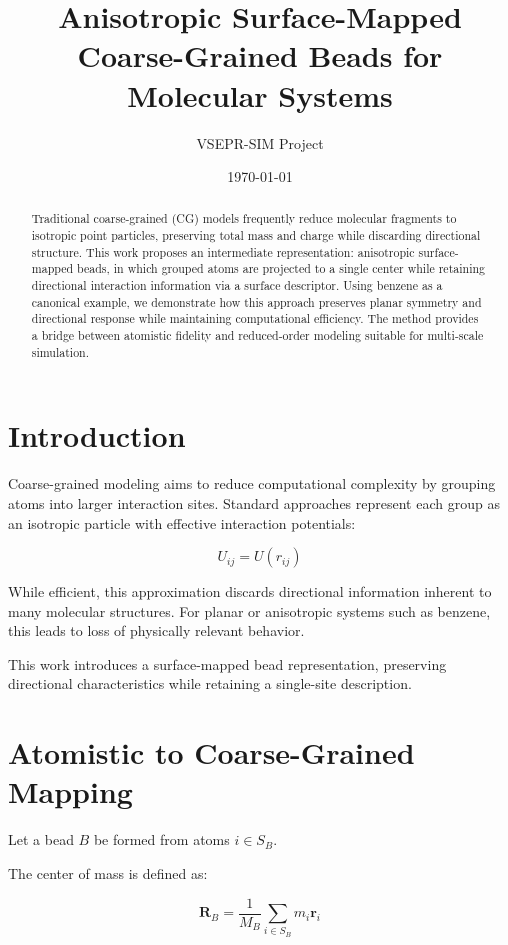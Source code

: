 \documentclass[11pt]{article}
\title{Anisotropic Surface-Mapped Coarse-Grained Beads for Molecular Systems}
\author{VSEPR-SIM Project}
\date{\today}
\begin{document}
\maketitle

\begin{abstract}
Traditional coarse-grained (CG) models frequently reduce molecular fragments to isotropic point particles, preserving total mass and charge while discarding directional structure. This work proposes an intermediate representation: anisotropic surface-mapped beads, in which grouped atoms are projected to a single center while retaining directional interaction information via a surface descriptor. Using benzene as a canonical example, we demonstrate how this approach preserves planar symmetry and directional response while maintaining computational efficiency. The method provides a bridge between atomistic fidelity and reduced-order modeling suitable for multi-scale simulation.
\end{abstract}

\section{Introduction}

Coarse-grained modeling aims to reduce computational complexity by grouping atoms into larger interaction sites. Standard approaches represent each group as an isotropic particle with effective interaction potentials:

\begin{equation}
U_{ij} = U(r_{ij})
\end{equation}

While efficient, this approximation discards directional information inherent to many molecular structures. For planar or anisotropic systems such as benzene, this leads to loss of physically relevant behavior.

This work introduces a surface-mapped bead representation, preserving directional characteristics while retaining a single-site description.

\section{Atomistic to Coarse-Grained Mapping}

Let a bead $B$ be formed from atoms $i \in S_B$.

The center of mass is defined as:

\begin{equation}
\mathbf{R}_B = \frac{1}{M_B} \sum_{i \in S_B} m_i \mathbf{r}_i
\end{equation}
\end{document}
